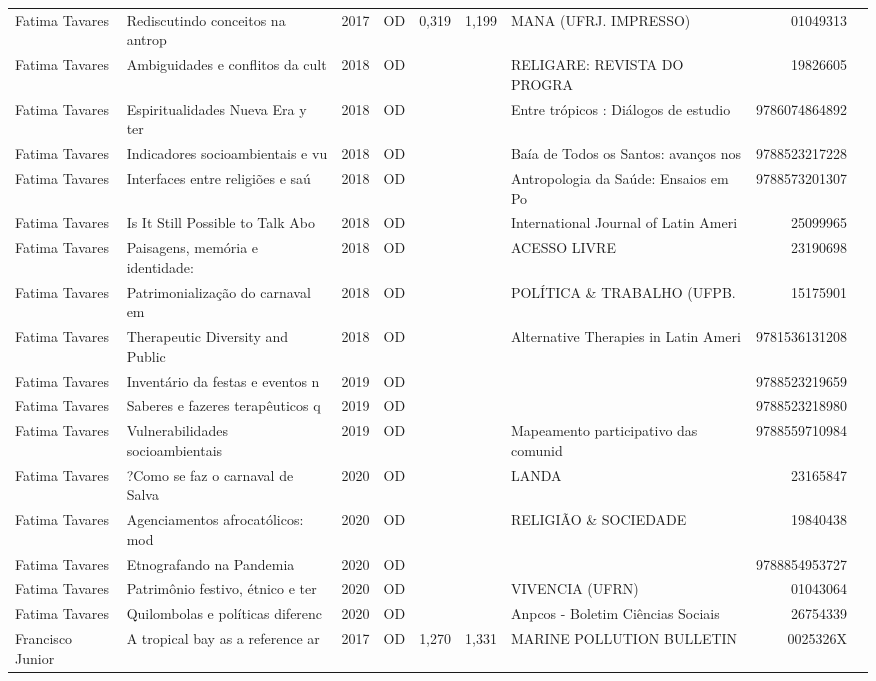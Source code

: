 \documentclass[12pt,brazil]{article}\usepackage[]{graphicx}\usepackage[]{xcolor}
\begin{document}
\begin{longtable}{lllrrllrr}
Fatima Tavares & Rediscutindo conceitos na antrop & 2017 & OD & 0,319 & 1,199 & MANA (UFRJ. IMPRESSO) & 01049313 \\
Fatima Tavares & Ambiguidades e conflitos da cult & 2018 & OD &  &  & RELIGARE: REVISTA DO PROGRA & 19826605 \\
Fatima Tavares & Espiritualidades Nueva Era y ter & 2018 & OD &  &  & Entre trópicos : Diálogos de estudio & 9786074864892 \\
Fatima Tavares & Indicadores socioambientais e vu & 2018 & OD &  &  & Baía de Todos os Santos: avanços nos & 9788523217228 \\
Fatima Tavares & Interfaces entre religiões e saú & 2018 & OD &  &  & Antropologia da Saúde: Ensaios em Po & 9788573201307 \\
Fatima Tavares & Is It Still Possible to Talk Abo & 2018 & OD &  &  & International Journal of Latin Ameri & 25099965 \\
Fatima Tavares & Paisagens, memória e identidade: & 2018 & OD &  &  & ACESSO LIVRE & 23190698 \\
Fatima Tavares & Patrimonialização do carnaval em & 2018 & OD &  &  & POLÍTICA \& TRABALHO (UFPB. & 15175901 \\
Fatima Tavares & Therapeutic Diversity and Public & 2018 & OD &  &  & Alternative Therapies in Latin Ameri & 9781536131208 \\
Fatima Tavares & Inventário da festas e eventos n & 2019 & OD &  &  &  & 9788523219659 \\
Fatima Tavares & Saberes e fazeres terapêuticos q & 2019 & OD &  &  &  & 9788523218980 \\
Fatima Tavares & Vulnerabilidades socioambientais & 2019 & OD &  &  & Mapeamento participativo das comunid & 9788559710984 \\
Fatima Tavares & ?Como se faz o carnaval de Salva & 2020 & OD &  &  & LANDA & 23165847 \\
Fatima Tavares & Agenciamentos afrocatólicos: mod & 2020 & OD &  &  & RELIGIÃO \& SOCIEDADE & 19840438 \\
Fatima Tavares & Etnografando na Pandemia & 2020 & OD &  &  &  & 9788854953727 \\
Fatima Tavares & Patrimônio festivo, étnico e ter & 2020 & OD &  &  & VIVENCIA (UFRN) & 01043064 \\
Fatima Tavares & Quilombolas e políticas diferenc & 2020 & OD &  &  & Anpcos - Boletim Ciências Sociais & 26754339 \\
Francisco Junior & A tropical bay as a reference ar & 2017 & OD & 1,270 & 1,331 & MARINE POLLUTION BULLETIN & 0025326X \\

\end{longtable}
\end{document}
